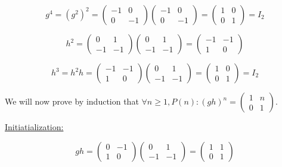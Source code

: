 $$
g^4 = (g^2)^2
    = \begin{pmatrix} -1 & 0 \\ 0 & -1 \end{pmatrix} \begin{pmatrix} -1 & 0 \\ 0 & -1 \end{pmatrix}
    = \begin{pmatrix}  1 & 0 \\ 0 &  1 \end{pmatrix}
    = I_2
$$

$$
h^2 = \begin{pmatrix} 0 & 1 \\ -1 & -1 \end{pmatrix} \begin{pmatrix} 0 & 1 \\ -1 & -1 \end{pmatrix} 
	= \begin{pmatrix} -1 & -1 \\ 1 & 0 \end{pmatrix}
$$

$$
h^3 = h^2 h
    = \begin{pmatrix} -1 & -1 \\ 1 & 0 \end{pmatrix} \begin{pmatrix} 0 & 1 \\ -1 & -1 \end{pmatrix}
	= \begin{pmatrix} 1 & 0 \\ 0 & 1 \end{pmatrix}
	= I_2
$$


We will now prove by induction that $\forall n \geq 1, P(n): (gh)^n = \begin{pmatrix} 1 & n \\ 0 & 1 \end{pmatrix}$.

\underline{Initiatialization:}

$$
gh = \begin{pmatrix} 0 & -1 \\ 1 & 0 \end{pmatrix} \begin{pmatrix} 0 & 1 \\ -1 & -1 \end{pmatrix}
   = \begin{pmatrix} 1 & 1 \\ 0 & 1 \end{pmatrix}
$$

